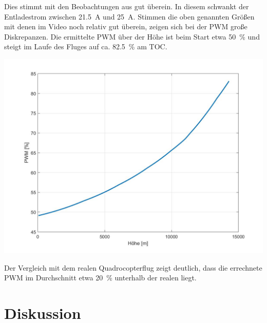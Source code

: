 Dies stimmt mit den Beobachtungen aus \cite{Anderson.2018} gut überein. In diesem schwankt der Entladestrom zwischen \SI{21,5}{A} und \SI{25}{A}.
Stimmen die oben genannten Größen mit denen im Video noch relativ gut überein, zeigen sich bei der PWM große Diskrepanzen. Die ermittelte PWM über der Höhe ist beim Start etwa \SI{50}{\%} und steigt im Laufe des Fluges auf ca. \SI{82,5}{\%} am TOC. 
\begin{center}
	\includegraphics[scale=0.3]{Diagramme/PWM.jpg}
	\label{pic:pwm_russland}
\end{center}
Der Vergleich mit dem realen Quadrocopterflug zeigt deutlich, dass die errechnete PWM im Durchschnitt etwa \SI{20}{\%} unterhalb der realen liegt.


\section{Diskussion}
\label{sec:nachbildung_diskussion}

